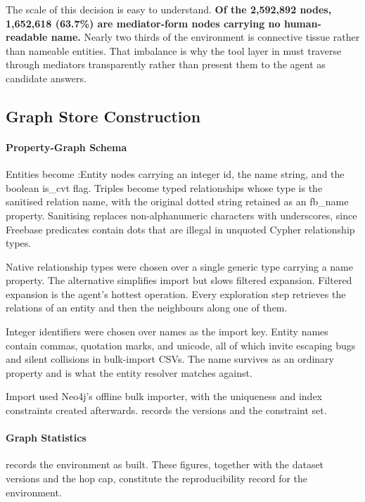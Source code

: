 The scale of this decision is easy to understand. \textbf{Of the 2{,}592{,}892
nodes, 1{,}652{,}618 (63.7\%) are mediator-form nodes carrying no human-readable
name.} Nearly two thirds of the environment is connective tissue rather than
nameable entities. That imbalance is why the tool layer in 
must traverse through mediators transparently rather than present them to the
agent as candidate answers.

\subsection{Graph Store Construction}\label{sec:graph-store}

\paragraph{Property-Graph Schema}

Entities become \textsf{:Entity} nodes carrying an integer \textsf{id}, the
\textsf{name} string, and the boolean \textsf{is\_cvt} flag. Triples become
typed relationships whose type is the sanitised relation name, with the original
dotted string retained as an \textsf{fb\_name} property. Sanitising replaces
non-alphanumeric characters with underscores, since Freebase predicates contain
dots that are illegal in unquoted Cypher relationship types.

Native relationship types were chosen over a single generic type carrying a name
property. The alternative simplifies import but slows filtered expansion.
Filtered expansion is the agent's hottest operation. Every exploration step
retrieves the relations of an entity and then the neighbours along one of them.

Integer identifiers were chosen over names as the import key. Entity names
contain commas, quotation marks, and unicode, all of which invite escaping bugs
and silent collisions in bulk-import CSVs. The name survives as an ordinary
property and is what the entity resolver matches against.


Import used Neo4j's offline bulk importer, with the uniqueness and index
constraints created afterwards.  records the versions and
the constraint set.

\paragraph{Graph Statistics}

 records the environment as built. These figures, together
with the dataset versions and the hop cap, constitute the reproducibility record
for the environment.

